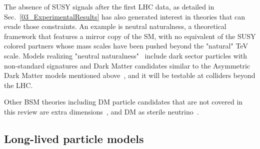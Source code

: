 \begin{marginnote}[]
\end{marginnote}


The absence of SUSY signals after the first LHC data, as detailed in Sec.~\ref{03_ExperimentalResults}
has also generated interest in theories that can evade those constraints. 
An example is neutral naturalness, a theoretical framework that features a mirror copy of the SM,
with no equivalent of the SUSY colored partners whose mass scales have been
pushed beyond the "natural" TeV scale. Models realizing "neutral naturalness"~\cite{Craig:2014aea}
include dark sector particles with non-standard signatures and Dark Matter candidates similar to the
Asymmetric Dark Matter models mentioned above~\cite{Garcia:2015toa},
and it will be testable at colliders beyond the LHC. 

Other BSM theories including DM particle candidates that are not covered in this review are
extra dimensions~\cite{Hooper:2007qk}, and DM as sterile neutrino~\cite{Adhikari:2016bei}.



\subsection{Long-lived particle models}
\label{sec:LLPModels}


